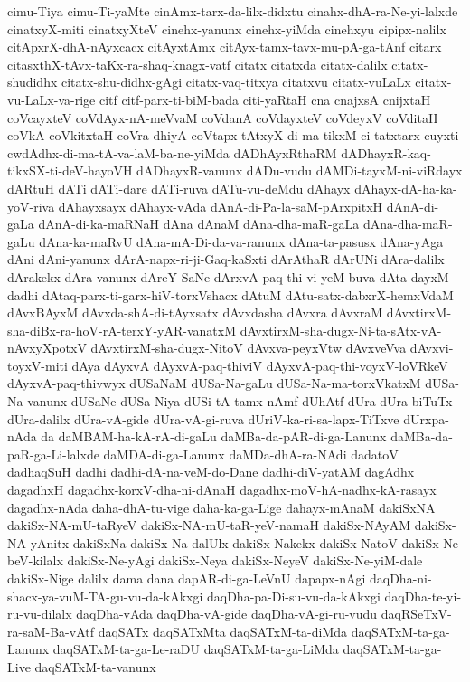 {cimu-Tiya
cimu-Ti-yaMte
cinAmx-tarx-da-lilx-didxtu
cinahx-dhA-ra-Ne-yi-lalxde
cinatxyX-miti
cinatxyXteV
cinehx-yanunx
cinehx-yiMda
cinehxyu
cipipx-nalilx
citApxrX-dhA-nAyxcacx
citAyxtAmx
citAyx-tamx-tavx-mu-pA-ga-tAnf
citarx
citasxthX-tAvx-taKx-ra-shaq-knagx-vatf
citatx
citatxda
citatx-dalilx
citatx-shudidhx
citatx-shu-didhx-gAgi
citatx-vaq-titxya
citatxvu
citatx-vuLaLx
citatx-vu-LaLx-va-rige
citf
citf-parx-ti-biM-bada
citi-yaRtaH
cna
cnajxsA
cnijxtaH
coVcayxteV
coVdAyx-nA-meVvaM
coVdanA
coVdayxteV
coVdeyxV
coVditaH
coVkA
coVkitxtaH
coVra-dhiyA
coVtapx-tAtxyX-di-ma-tikxM-ci-tatxtarx
cuyxti
cwdAdhx-di-ma-tA-va-laM-ba-ne-yiMda
dADhAyxRthaRM
dADhayxR-kaq-tikxSX-ti-deV-hayoVH
dADhayxR-vanunx
dADu-vudu
dAMDi-tayxM-ni-viRdayx
dARtuH
dATi
dATi-dare
dATi-ruva
dATu-vu-deMdu
dAhayx
dAhayx-dA-ha-ka-yoV-riva
dAhayxsayx
dAhayx-vAda
dAnA-di-Pa-la-saM-pArxpitxH
dAnA-di-gaLa
dAnA-di-ka-maRNaH
dAna
dAnaM
dAna-dha-maR-gaLa
dAna-dha-maR-gaLu
dAna-ka-maRvU
dAna-mA-Di-da-va-ranunx
dAna-ta-pasusx
dAna-yAga
dAni
dAni-yanunx
dArA-napx-ri-ji-Gaq-kaSxti
dArAthaR
dArUNi
dAra-dalilx
dArakekx
dAra-vanunx
dAreY-SaNe
dArxvA-paq-thi-vi-yeM-buva
dAta-dayxM-dadhi
dAtaq-parx-ti-garx-hiV-torxVshacx
dAtuM
dAtu-satx-dabxrX-hemxVdaM
dAvxBAyxM
dAvxda-shA-di-tAyxsatx
dAvxdasha
dAvxra
dAvxraM
dAvxtirxM-sha-diBx-ra-hoV-rA-terxY-yAR-vanatxM
dAvxtirxM-sha-dugx-Ni-ta-sAtx-vA-nAvxyXpotxV
dAvxtirxM-sha-dugx-NitoV
dAvxva-peyxVtw
dAvxveVva
dAvxvi-toyxV-miti
dAya
dAyxvA
dAyxvA-paq-thiviV
dAyxvA-paq-thi-voyxV-loVRkeV
dAyxvA-paq-thivwyx
dUSaNaM
dUSa-Na-gaLu
dUSa-Na-ma-torxVkatxM
dUSa-Na-vanunx
dUSaNe
dUSa-Niya
dUSi-tA-tamx-nAmf
dUhAtf
dUra
dUra-biTuTx
dUra-dalilx
dUra-vA-gide
dUra-vA-gi-ruva
dUriV-ka-ri-sa-lapx-TiTxve
dUrxpa-nAda
da
daMBAM-ha-kA-rA-di-gaLu
daMBa-da-pAR-di-ga-Lanunx
daMBa-da-paR-ga-Li-lalxde
daMDA-di-ga-Lanunx
daMDa-dhA-ra-NAdi
dadatoV
dadhaqSuH
dadhi
dadhi-dA-na-veM-do-Dane
dadhi-diV-yatAM
dagAdhx
dagadhxH
dagadhx-korxV-dha-ni-dAnaH
dagadhx-moV-hA-nadhx-kA-rasayx
dagadhx-nAda
daha-dhA-tu-vige
daha-ka-ga-Lige
dahayx-mAnaM
dakiSxNA
dakiSx-NA-mU-taRyeV
dakiSx-NA-mU-taR-yeV-namaH
dakiSx-NAyAM
dakiSx-NA-yAnitx
dakiSxNa
dakiSx-Na-dalUlx
dakiSx-Nakekx
dakiSx-NatoV
dakiSx-Ne-beV-kilalx
dakiSx-Ne-yAgi
dakiSx-Neya
dakiSx-NeyeV
dakiSx-Ne-yiM-dale
dakiSx-Nige
dalilx
dama
dana
dapAR-di-ga-LeVnU
dapapx-nAgi
daqDha-ni-shacx-ya-vuM-TA-gu-vu-da-kAkxgi
daqDha-pa-Di-su-vu-da-kAkxgi
daqDha-te-yi-ru-vu-dilalx
daqDha-vAda
daqDha-vA-gide
daqDha-vA-gi-ru-vudu
daqRSeTxV-ra-saM-Ba-vAtf
daqSATx
daqSATxMta
daqSATxM-ta-diMda
daqSATxM-ta-ga-Lanunx
daqSATxM-ta-ga-Le-raDU
daqSATxM-ta-ga-LiMda
daqSATxM-ta-ga-Live
daqSATxM-ta-vanunx
}

